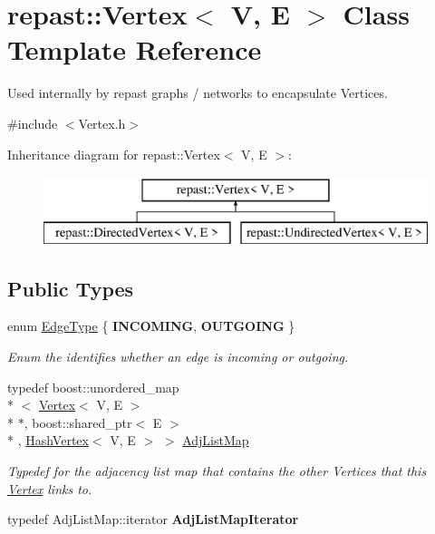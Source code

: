 \hypertarget{classrepast_1_1_vertex}{\section{repast\-:\-:Vertex$<$ V, E $>$ Class Template Reference}
\label{classrepast_1_1_vertex}
}


Used internally by repast graphs / networks to encapsulate Vertices.  




{\ttfamily \#include $<$Vertex.\-h$>$}

Inheritance diagram for repast\-:\-:Vertex$<$ V, E $>$\-:\begin{figure}[H]
\begin{center}
\leavevmode
\includegraphics[height=2.000000cm]{classrepast_1_1_vertex}
\end{center}
\end{figure}
\subsection*{Public Types}
\begin{DoxyCompactItemize}
\item 
enum \hyperlink{classrepast_1_1_vertex_a8b4819d648c7c0dd8b0622beea77cc14}{Edge\-Type} \{ {\bfseries I\-N\-C\-O\-M\-I\-N\-G}, 
{\bfseries O\-U\-T\-G\-O\-I\-N\-G}
 \}
\begin{DoxyCompactList}\small\item\em Enum the identifies whether an edge is incoming or outgoing. \end{DoxyCompactList}\item 
\hypertarget{classrepast_1_1_vertex_a87cfe13bd6b9bd535e6f3d08329908f6}{typedef boost\-::unordered\-\_\-map\\*
$<$ \hyperlink{classrepast_1_1_vertex}{Vertex}$<$ V, E $>$\\*
 $\ast$, boost\-::shared\-\_\-ptr$<$ E $>$\\*
, \hyperlink{structrepast_1_1_hash_vertex}{Hash\-Vertex}$<$ V, E $>$ $>$ \hyperlink{classrepast_1_1_vertex_a87cfe13bd6b9bd535e6f3d08329908f6}{Adj\-List\-Map}}\label{classrepast_1_1_vertex_a87cfe13bd6b9bd535e6f3d08329908f6}

\begin{DoxyCompactList}\small\item\em Typedef for the adjacency list map that contains the other Vertices that this \hyperlink{classrepast_1_1_vertex}{Vertex} links to. \end{DoxyCompactList}\item 
\hypertarget{classrepast_1_1_vertex_acc25f7ed53dd094627684be18ae9b015}{typedef Adj\-List\-Map\-::iterator {\bfseries Adj\-List\-Map\-Iterator}}\label{classrepast_1_1_vertex_acc25f7ed53dd094627684be18ae9b015}

\end{DoxyCompactItemize}
